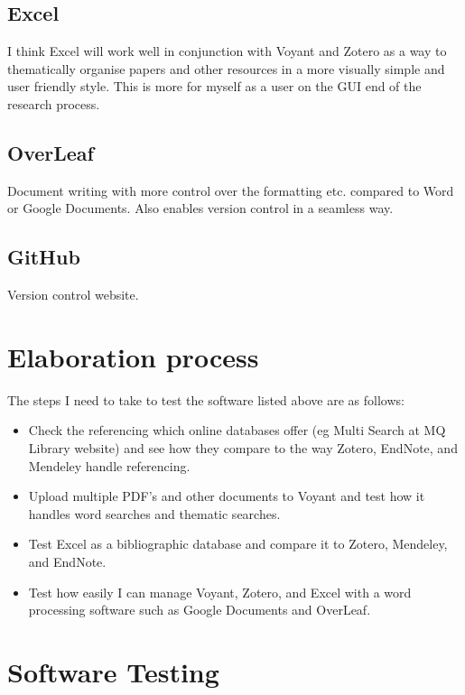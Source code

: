 \documentclass{article}
\begin{document}
\subsection{Excel}

I think Excel will work well in conjunction with Voyant and Zotero as a way to thematically organise papers and other resources in a more visually simple and user friendly style. This is more for myself as a user on the GUI end of the research process.

\subsection{OverLeaf}

Document writing with more control over the formatting etc. compared to Word or Google Documents. Also enables version control in a seamless way.

\subsection{GitHub}

Version control website.

\section{Elaboration process}

The steps I need to take to test the software listed above are as follows:

\begin{itemize}
    \item Check the referencing which online databases offer (eg Multi Search at MQ Library website) and see how they compare to the way Zotero, EndNote, and Mendeley handle referencing.
    \item Upload multiple PDF's and other documents to Voyant and test how it handles word searches and thematic searches.
    \item Test Excel as a bibliographic database and compare it to Zotero, Mendeley, and EndNote.
    \item Test how easily I can manage Voyant, Zotero, and Excel with a word processing software such as Google Documents and OverLeaf.
\end{itemize}

\section{Software Testing}
\end{document}
